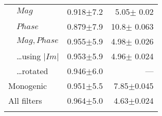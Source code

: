 \begin{tabularx}{\columnwidth}{X X r r}
\midrule
\multirow{5}{2cm}{\dtcwt{}}
        & $Mag$                         & 0.918$\pm$7.2     & 5.05$\pm$ 0.02 \\
        & $Phase$                       & 0.879$\pm$7.9     & 10.8$\pm$ 0.063 \\
        & $Mag,Phase$                   & 0.955$\pm$5.9     & 4.98$\pm$ 0.026 \\
        & \ldots using $|Im|$           & 0.953$\pm$5.9     & 4.96$\pm$ 0.024 \\
        & \ldots rotated                & 0.946$\pm$6.0     & --- \\
\midrule
\multicolumn{2}{l}{Monogenic}           & 0.951$\pm$5.5     & 7.85$\pm$0.045 \\
\midrule
\multicolumn{2}{l}{All filters}         & 0.964$\pm$5.0     & 4.63$\pm$0.024 \\

\bottomrule
\noalign{\smallskip}
\end{tabularx} 